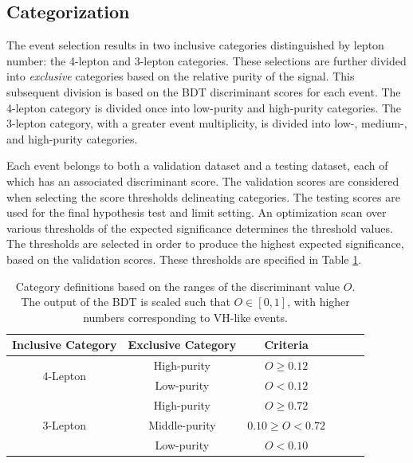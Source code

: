 \subsection{Categorization}

The event selection results in two inclusive categories distinguished by lepton number: the 4-lepton and 3-lepton categories.
These selections are further divided into \emph{exclusive} categories based on the relative purity of the signal.
This subsequent division is based on the BDT discriminant scores for each event.
The 4-lepton category is divided once into low-purity and high-purity categories.
The 3-lepton category, with a greater event multiplicity, is divided into low-, medium-, and high-purity categories.

Each event belongs to both a validation dataset and a testing dataset, each of which has an associated discriminant score.
The validation scores are considered when selecting the score thresholds delineating categories.
The testing scores are used for the final hypothesis test and limit setting.
An optimization scan over various thresholds of the expected significance determines the threshold values.
The thresholds are selected in order to produce the highest expected significance, based on the validation scores.
These thresholds are specified in Table \ref{tab:hmmBdtCuts}.

\begin{table}[htp]
\caption{Category definitions based on the ranges of the discriminant value $O$. The output of the BDT is scaled such that $O\in[0,1]$, with higher numbers corresponding to VH-like events.}
\begin{center}
\begin{tabular}{c c c l l l}
\toprule
Inclusive Category & Exclusive Category & Criteria \\
\midrule
\multirow{2}{*}{4-Lepton} & High-purity & $O\ge0.12$ \\
                          & Low-purity & $O<0.12$ \\
\midrule
\multirow{3}{*}{3-Lepton} & High-purity & $O\ge0.72$ \\
                          & Middle-purity & $0.10\ge O<0.72$ \\
                          & Low-purity & $O<0.10$ \\
\bottomrule
\end{tabular}
\label{tab:hmmBdtCuts}
\end{center}
\end{table}

